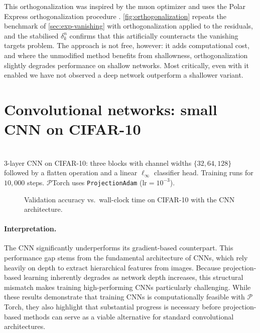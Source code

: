 This orthogonalization was inspired by the muon optimizer and uses the Polar Express
orthogonalization procedure \cite{amsel2025polar}. \cref{fig:orthogonalization}
repeats the benchmark of \cref{sec:exp-vanishing} with orthogonalization applied to
the residuals, and the stabilised $\delta_k^{n}$ confirms that this artificially
counteracts the vanishing targets problem. The approach is not free, however: it
adds computational cost, and where the unmodified method benefits from shallowness,
orthogonalization slightly degrades performance on shallow networks. Most critically,
even with it enabled we have not observed a deep network outperform a shallower
variant.
\section{Convolutional networks: small CNN on CIFAR-10}
\label{sec:exp-cnn}
\begin{tcolorbox}[reprocard, title=Setup]\\
3-layer CNN on CIFAR-10: three blocks with channel widths $\{32, 64, 128\}$ followed by a flatten operation and a linear $\ell_\infty$ classifier head. Training runs for $10{,}000$ steps. $\mathcal{P}$Torch uses \texttt{ProjectionAdam} ($\text{lr} = 10^{-3}$).
\end{tcolorbox}
\begin{figure}[ht]
    \centering
    \caption{Validation accuracy vs.\ wall-clock time on CIFAR-10 with the
    CNN architecture.}
    \vfill
    \label{fig:cnn}
\end{figure}
\paragraph{Interpretation.} The CNN significantly underperforms its gradient-based counterpart. This performance gap stems from the fundamental architecture of CNNs, which rely heavily on depth to extract hierarchical features from images. Because projection-based learning inherently degrades as network depth increases, this structural mismatch makes training high-performing CNNs particularly challenging. While these results demonstrate that training CNNs is computationally feasible with $\mathcal{P}$Torch, they also highlight that substantial progress is necessary before projection-based methods can serve as a viable alternative for standard convolutional architectures.

